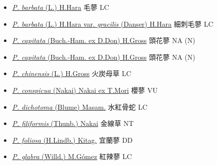 \begin{itemize}
  \begin{itemize}
        \item[] \href{http://www.theplantlist.org/tpl1.1/search?q=Persicaria+barbata}{\textit{P. barbata} (L.) H.Hara}   毛蓼   LC
        \item[] \href{http://www.theplantlist.org/tpl1.1/search?q=Persicaria+barbata+var.+gracilis}{\textit{P. barbata} (L.) H.Hara var. \textit{gracilis} (Danser) H.Hara}   細刺毛蓼   LC
        \item[] \href{http://www.theplantlist.org/tpl1.1/search?q=Persicaria+capitata}{\textit{P. capitata} (Buch.-Ham. ex D.Don) H.Gross}   頭花蓼   NA (N)
        \item[] \href{http://www.theplantlist.org/tpl1.1/search?q=Persicaria+capitata}{\textit{P. capitata} (Buch.-Ham. ex D.Don) H.Gross}   頭花蓼   NA (N)
        \item[] \href{http://www.theplantlist.org/tpl1.1/search?q=Persicaria+chinensis}{\textit{P. chinensis} (L.) H.Gross}   火炭母草   LC
        \item[] \href{http://www.theplantlist.org/tpl1.1/search?q=Persicaria+conspicua}{\textit{P. conspicua} (Nakai) Nakai ex T.Mori}   櫻蓼   VU
        \item[] \href{http://www.theplantlist.org/tpl1.1/search?q=Persicaria+dichotoma}{\textit{P. dichotoma} (Blume) Masam.}   水紅骨蛇   LC
        \item[] \href{http://www.theplantlist.org/tpl1.1/search?q=Persicaria+filiformis}{\textit{P. filiformis} (Thunb.) Nakai}   金線草   NT
        \item[] \href{http://www.theplantlist.org/tpl1.1/search?q=Persicaria+foliosa}{\textit{P. foliosa} (H.Lindb.) Kitag.}   宜蘭蓼   DD
        \item[] \href{http://www.theplantlist.org/tpl1.1/search?q=Persicaria+glabra}{\textit{P. glabra} (Willd.) M.Gómez}   紅辣蓼   LC

\end{itemize}
\end{itemize}
